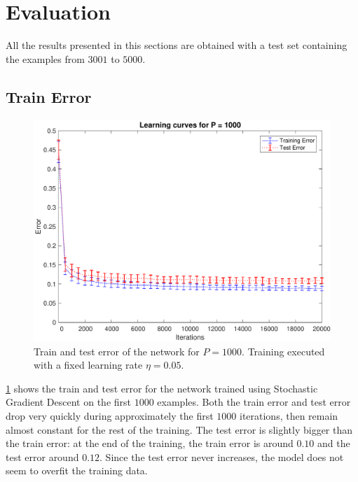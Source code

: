 \section{Evaluation}
\label{sec:evaluation}

All the results presented in this sections are obtained with a test set containing the examples from $3001$ to $5000$.

\subsection{Train Error}
\begin{figure}[t]
	\centering
	\includegraphics[width=\columnwidth]{figures/error}
	\caption{Train and test error of the network for $P = 1000$. Training executed with a fixed
	learning rate $\eta = 0.05$.}
	\label{fig:training_error}
\end{figure}

\cref{fig:training_error} shows the train and test error for the network trained using Stochastic Gradient Descent on the first $1000$ examples.
Both the train error and test error drop very quickly during approximately the first $1000$ iterations, then remain almost constant for the rest of the training.
The test error is slightly bigger than the train error:
at the end of the training, the train error is around $0.10$ and the test error around $0.12$.
Since the test error never increases, the model does not seem to overfit the training data.

